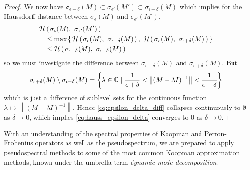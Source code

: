 \begin{proof}
    We now have 
    $\sigma_{\epsilon - \delta} (M) 
    \subset \sigma_{\epsilon'} (M') 
    \subset \sigma_{\epsilon + \delta} (M)$
    which implies for the Haussdorff distance between $\sigma_\epsilon (M)$ and 
    $\sigma_{\epsilon'} (M')$,
    \begin{align}
        \scrH & \left(\, \sigma_\epsilon (M),\ \sigma_{\epsilon'} (M') \,\right) \\
        & \leq \max \left\{\,
            \scrH \left(\, \sigma_\epsilon (M),\ \sigma_{\epsilon - \delta} (M) \,\right),\ 
            \scrH \left(\, \sigma_\epsilon (M),\ \sigma_{\epsilon + \delta} (M) \,\right) 
        \,\right\} \\
        & \leq \scrH \left(\, 
            \sigma_{\epsilon - \delta} (M),\ 
            \sigma_{\epsilon + \delta} (M) 
        \,\right) \label{eq:hauss_epsilon_delta}
    \end{align}
    so we must investigate the difference between $\sigma_{\epsilon - \delta} (M)$ and 
    $\sigma_{\epsilon + \delta} (M)$. But 
    \begin{equation}
        \label{eq:epsilon_delta_diff}
        \sigma_{\epsilon + \delta} (M) \setminus \sigma_{\epsilon - \delta} (M) 
        = \left\{ \lambda \in \mathbb{C} \mid 
            \frac{1}{\epsilon + \delta}
            < \left\| (M - \lambda I)^{-1} \right\| 
            < \frac{1}{\epsilon - \delta}
        \right\}
    \end{equation}
    which is just a difference of sublevel sets for the continuous function 
    $\lambda \mapsto \left\| (M - \lambda I)^{-1} \right\|$. Hence 
    \ref{eq:epsilon_delta_diff} collapses continuously to $\emptyset$ as $\delta \to 0$, 
    which implies \ref{eq:hauss_epsilon_delta} converges to $0$ as $\delta \to 0$. 
\end{proof}

With an understanding of the spectral properties of Koopman and Perron-Frobenius operators 
as well as the pseudospectrum, we are prepared to apply pseudospectral methods to some of 
the most common Koopman approximation methods, known under the umbrella term 
\emph{dynamic mode decomposition}. 


